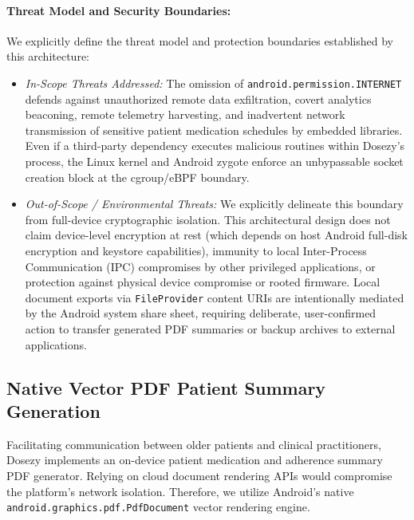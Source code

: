 \documentclass[11pt,a4paper]{article}
\begin{document}
\paragraph{Threat Model and Security Boundaries:} We explicitly define the threat model and protection boundaries established by this architecture:
\begin{itemize}[leftmargin=*]
    \item \emph{In-Scope Threats Addressed:} The omission of \texttt{android.permission.INTERNET} defends against unauthorized remote data exfiltration, covert analytics beaconing, remote telemetry harvesting, and inadvertent network transmission of sensitive patient medication schedules by embedded libraries. Even if a third-party dependency executes malicious routines within Dosezy's process, the Linux kernel and Android zygote enforce an unbypassable socket creation block at the cgroup/eBPF boundary.
    \item \emph{Out-of-Scope / Environmental Threats:} We explicitly delineate this boundary from full-device cryptographic isolation. This architectural design does not claim device-level encryption at rest (which depends on host Android full-disk encryption and keystore capabilities), immunity to local Inter-Process Communication (IPC) compromises by other privileged applications, or protection against physical device compromise or rooted firmware. Local document exports via \texttt{FileProvider} content URIs are intentionally mediated by the Android system share sheet, requiring deliberate, user-confirmed action to transfer generated PDF summaries or backup archives to external applications.
\end{itemize}

\subsection{Native Vector PDF Patient Summary Generation}

Facilitating communication between older patients and clinical practitioners, Dosezy implements an on-device patient medication and adherence summary PDF generator. Relying on cloud document rendering APIs would compromise the platform's network isolation. Therefore, we utilize Android's native \texttt{android.graphics.pdf.PdfDocument} vector rendering engine.
\end{document}

